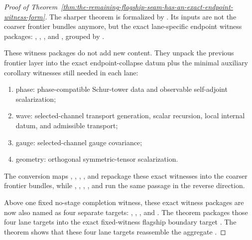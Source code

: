 \begin{proof}[Proof of Theorem~\ref{thm:the-remaining-flagship-seam-has-an-exact-endpoint-witness-form}]
\label{proof:thm:the-remaining-flagship-seam-has-an-exact-endpoint-witness-form}
The sharper theorem is formalized by
.
Its inputs are not the coarser frontier bundles anymore, but the exact
lane-specific endpoint witness packages:
,
,
,
and , grouped by
.

These witness packages do not add new content. They unpack the previous
frontier layer into the exact endpoint-collapse datum plus the minimal
auxiliary corollary witnesses still needed in each lane:
\begin{enumerate}
\item phase: phase-compatible Schur-tower data and observable self-adjoint
      scalarization;
\item wave: selected-channel transport generation, scalar recursion, local
      internal datum, and admissible transport;
\item gauge: selected-channel gauge covariance;
\item geometry: orthogonal symmetric-tensor scalarization.
\end{enumerate}
The conversion maps
,
,
,
, and
repackage these exact witnesses into the coarser frontier bundles, while
,
,
,
, and
run the same passage in the reverse direction.

Above one fixed no-stage completion witness, these exact witness packages are
now also named as four separate targets:
,
,
, and
. The theorem
packages those four lane targets into the exact fixed-witness flagship
boundary target . The theorem
shows that these four lane targets reassemble the aggregate
.


\end{proof}

